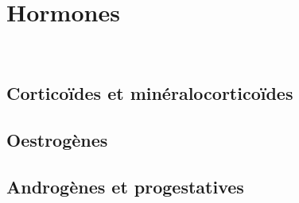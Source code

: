\section{Hormones}

\begin{boiteCodeTex}{}
  \chemfig{!\creatinine}
  \chemfig{!\DOPA}
  \chemfig{!\DOPAH} \\[8pt]
  \chemfig{!\prostaglandine}
\end{boiteCodeTex}

\subsection{Corticoïdes et minéralocorticoïdes}

\begin{boiteCodeTex}{}
  \chemfig{!\cortisol} \hspace*{-50pt}%
  \chemfig{!\corticosterone} \hspace*{-64pt}%
  \chemfig{!\aldosterone}
\end{boiteCodeTex}

\subsection{Oestrogènes}

\begin{boiteCodeTex}{}
  \chemfig{!\estrone} \hspace*{-40pt}%
  \chemfig{!\estriol} \hspace*{-56pt}%
  \chemfig{!\estradiol}
\end{boiteCodeTex}

\subsection{Androgènes et progestatives}

\begin{boiteCodeTex}{}
  \chemfig{!\testosterone} \hspace*{-12pt}%
  \chemfig{!\dihydrotestosterone} \hspace*{-12pt}%
  \chemfig{!\androstenedione}
\end{boiteCodeTex}

\begin{boiteCodeTex}{}
  \chemfig{!\DHEA} \hspace*{-12pt}%
  \chemfig{!\DHEAS} \hspace*{-12pt}%
  \chemfig{!\progesterone}
\end{boiteCodeTex}
